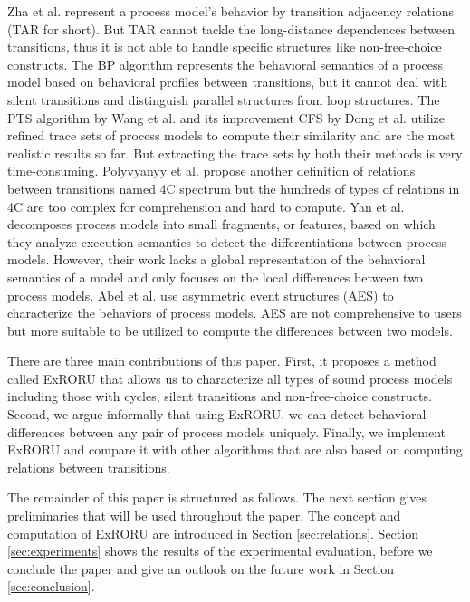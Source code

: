 \documentclass{llncs}
\begin{document}
Zha et al. \cite{zha2010workflow} represent a process model's behavior by transition adjacency relations (TAR for short). But TAR cannot tackle the long-distance dependences between transitions, thus it is not able to handle specific structures like non-free-choice constructs. The BP algorithm \cite{weidlich2011efficient} represents the behavioral semantics of a process model based on behavioral profiles between transitions, but it cannot deal with silent transitions and distinguish parallel structures from loop structures. The PTS algorithm by Wang et al. \cite{wang2010behavioral} and its improvement CFS by Dong et al. \cite{dong2014cfs} utilize refined trace sets of process models to compute their similarity and are the most realistic results so far. But extracting the trace sets by both their methods is very time-consuming. Polyvyanyy et al. \cite{polyvyanyy20144c} propose another definition of relations between transitions named 4C spectrum but the hundreds of types of relations in 4C are too complex for comprehension and hard to compute. Yan et al. \cite{yan2014efficient} decomposes process models into small fragments, or features, based on which they analyze execution semantics to detect the differentiations between process models. However, their work lacks a global representation of the behavioral semantics of a model and only focuses on the local differences between two process models. Abel et al. \cite{armas2014behavioral} use asymmetric event structures (AES) to characterize the behaviors of process models. AES are not comprehensive to users but more suitable to be utilized to compute the differences between two models.

There are three main contributions of this paper. First, it proposes a method called ExRORU that allows us to characterize all types of sound process models including those with cycles, silent transitions and non-free-choice constructs. Second, we argue informally that using ExRORU, we can detect behavioral differences between any pair of process models uniquely. Finally, we implement ExRORU and compare it with other algorithms that are also based on computing relations between transitions.

The remainder of this paper is structured as follows. The next section gives preliminaries that will be used throughout the paper. The concept and computation of ExRORU are introduced in Section \ref{sec:relations}. Section \ref{sec:experiments} shows the results of the experimental evaluation, before we conclude the paper and give an outlook on the future work in Section \ref{sec:conclusion}.
\end{document}
